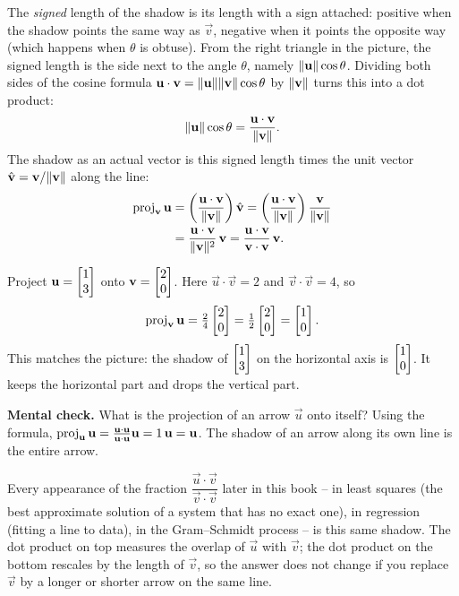 The \emph{signed} length of the shadow is its length with a sign attached: positive
when the shadow points the same way as $\vec v$, negative when it points the opposite
way (which happens when $\theta$ is obtuse). From the right triangle in the picture,
the signed length is the side next to the angle $\theta$, namely
$\lVert\mathbf{u}\rVert\cos\theta$. Dividing both sides of the cosine formula
$\mathbf{u}\cdot\mathbf{v}=\lVert\mathbf{u}\rVert\lVert\mathbf{v}\rVert\cos\theta$ by $\lVert\mathbf{v}\rVert$ turns this
into a dot product:
\[
  \lVert\mathbf{u}\rVert\cos\theta = \frac{\mathbf{u}\cdot\mathbf{v}}{\lVert\mathbf{v}\rVert}.
\]
The shadow as an actual vector is this signed length times the unit vector
$\hat{\mathbf{v}} = \mathbf{v}/\lVert\mathbf{v}\rVert$ along the line:
\begin{align*}
  \operatorname{proj}_{\mathbf{v}}\mathbf{u}
   &= \left(\frac{\mathbf{u}\cdot\mathbf{v}}{\lVert\mathbf{v}\rVert}\right)\hat{\mathbf{v}}
    = \left(\frac{\mathbf{u}\cdot\mathbf{v}}{\lVert\mathbf{v}\rVert}\right)\frac{\mathbf{v}}{\lVert\mathbf{v}\rVert}\\
   &= \frac{\mathbf{u}\cdot\mathbf{v}}{\lVert\mathbf{v}\rVert^2}\,\mathbf{v}
    = \frac{\mathbf{u}\cdot\mathbf{v}}{\mathbf{v}\cdot\mathbf{v}}\,\mathbf{v}.
\end{align*}

\begin{example}
Project $\mathbf{u} = \begin{bmatrix}1\\3\end{bmatrix}$ onto $\mathbf{v} = \begin{bmatrix}2\\0\end{bmatrix}$. Here
$\vec u\cdot\vec v = 2$ and $\vec v\cdot\vec v = 4$, so
\[
  \operatorname{proj}_{\mathbf{v}}\mathbf{u} = \tfrac24\begin{bmatrix}2\\0\end{bmatrix} = \tfrac12\begin{bmatrix}2\\0\end{bmatrix}
                       = \begin{bmatrix}1\\0\end{bmatrix}.
\]
This matches the picture: the shadow of $\begin{bmatrix}1\\3\end{bmatrix}$ on the horizontal axis is
$\begin{bmatrix}1\\0\end{bmatrix}$. It keeps the horizontal part and drops the vertical part.
\end{example}

\textbf{Mental check.} What is the projection of an arrow $\vec u$ onto itself?
Using the formula, $\operatorname{proj}_{\mathbf{u}}\mathbf{u} = \frac{\mathbf{u}\cdot\mathbf{u}}{\mathbf{u}\cdot\mathbf{u}}\mathbf{u} = 1\,\mathbf{u} = \mathbf{u}$.
The shadow of an arrow along its own line is the entire arrow.

\begin{intuitionbox}
Every appearance of the fraction $\dfrac{\vec u\cdot\vec v}{\vec v\cdot\vec v}$ later
in this book -- in least squares (the best approximate solution of a system that has
no exact one), in regression (fitting a line to data), in the Gram--Schmidt process --
is this same shadow. The dot product on top measures the overlap of $\vec u$ with
$\vec v$; the dot product on the bottom rescales by the length of $\vec v$, so the
answer does not change if you replace $\vec v$ by a longer or shorter arrow on the
same line.
\end{intuitionbox}

